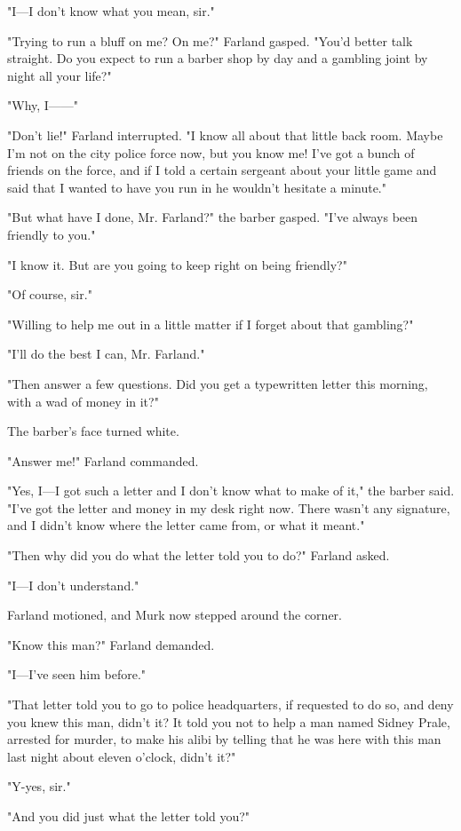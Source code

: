 \documentclass{novel}
\begin{document}
"I---I don't know what you mean, sir."

"Trying to run a bluff on me? On me?" Farland gasped. "You'd better talk straight. Do you expect to run a barber shop by day and a gambling joint by night all your life?"

"Why, I------"

"Don't lie!" Farland interrupted. "I know all about that little back room. Maybe I'm not on the city police force now, but you know me! I've got a bunch of friends on the force, and if I told a certain sergeant about your little game and said that I wanted to have you run in he wouldn't hesitate a minute."

"But what have I done, Mr. Farland?" the barber gasped. "I've always been friendly to you."

"I know it. But are you going to keep right on being friendly?"

"Of course, sir."

"Willing to help me out in a little matter if I forget about that gambling?"

"I'll do the best I can, Mr. Farland."

"Then answer a few questions. Did you get a typewritten letter this morning, with a wad of money in it?"

The barber's face turned white.

"Answer me!" Farland commanded.

"Yes, I---I got such a letter and I don't know what to make of it," the barber said. "I've got the letter and money in my desk right now. There wasn't any signature, and I didn't know where the letter came from, or what it meant."

"Then why did you do what the letter told you to do?" Farland asked.

"I---I don't understand."

Farland motioned, and Murk now stepped around the corner.

"Know this man?" Farland demanded.

"I---I've seen him before."

"That letter told you to go to police headquarters, if requested to do so, and deny you knew this man, didn't it? It told you not to help a man named Sidney Prale, arrested for murder, to make his alibi by telling that he was here with this man last night about eleven o'clock, didn't it?"

"Y-yes, sir."

"And you did just what the letter told you?"
\end{document}
